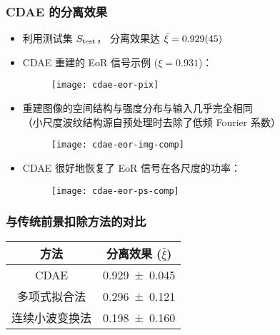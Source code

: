 \documentclass{beamer}
\begin{document}
\begin{frame}[subsec]
  \frametitle{CDAE 的分离效果}
  \begin{itemize}
    \item 利用测试集 $S_{\text{test}}$，
      分离效果达 $\bar{\xi} = \num{0.929 +- 0.045}$
    \item CDAE 重建的 EoR 信号示例 ($\xi = 0.931$)：
      \begin{figure}
        \centering
        \texttt{[image: cdae-eor-pix]}
      \end{figure}
  \end{itemize}
\end{frame}

\begin{frame}
  \vspace{1ex}
  \begin{itemize}
    \item 重建图像的空间结构与强度分布与输入几乎完全相同 \\
      {\small（小尺度波纹结构源自预处理时去除了低频 Fourier 系数）}
      \begin{figure}
        \centering
        \texttt{[image: cdae-eor-img-comp]}
      \end{figure}
    \item CDAE 很好地恢复了 EoR 信号在各尺度的功率：
      \begin{figure}
        \centering
        \texttt{[image: cdae-eor-ps-comp]}
      \end{figure}
  \end{itemize}
\end{frame}

\begin{frame}[subsec]
  \frametitle{与传统前景扣除方法的对比}
  \begin{table}
    \centering
    \begin{tabular}{cc}
      \toprule
      方法 & 分离效果 ($\bar{\xi}$) \\
      \midrule
      CDAE & \num{0.929 +- 0.045} \\
      \midrule
      多项式拟合法 & \num{0.296 +- 0.121} \\
      连续小波变换法 & \num{0.198 +- 0.160} \\
      \bottomrule
    \end{tabular}
  \end{table}
\end{frame}
\end{document}
